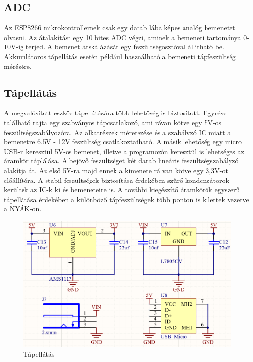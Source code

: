 \subsection{ADC}
Az ESP8266 mikrokontrollernek csak egy darab lába képes analóg bemenetet olvasni. Az átalakítást egy 10 bites ADC végzi, aminek a bemeneti tartománya 0-10V-ig terjed. A bemenet átskálázását egy feszültségosztóval állítható be. Akkumlátoros tápellátás esetén például használható a bemeneti tápfeszültség mérésére.

\clearpage
\subsection{Tápellátás}
A megvalósított eszköz tápellátására több lehetőség is biztosított. Egyrész található rajta egy szabványos tápcsatlakozó, ami rávan kötve egy 5V-os feszültségszabályozóra. Az alkatrészek méretezése és a szabályzó IC miatt a bemenetre 6.5V - 12V feszültség csatlakoztatható. A másik lehetőség egy micro USB-n keresztül 5V-os bemenet, illetve a programozón keresztül is lehetséges az áramkör táplálása. A bejövő feszültséget két darab lineáris feszültségszabályzó alakítja át. Az első 5V-ra majd ennek a kimenete rá van kötve egy 3,3V-ot előállítóra. A stabil feszültségek biztosítása érdekében szűrő kondenzátorok kerültek az IC-k ki és bemeneteire is. A további kiegészítő áramkörök egyszerű tápellátása érdekében a különböző tápfeszültségek több ponton is kilettek vezetve a NYÁK-on.

\begin{figure}[!ht]
    \centering
    \includegraphics[width=130mm, keepaspectratio]{figures/power.png}
    \caption{Tápellátás}
    \label{fig:TeXstudio}
\end{figure}


